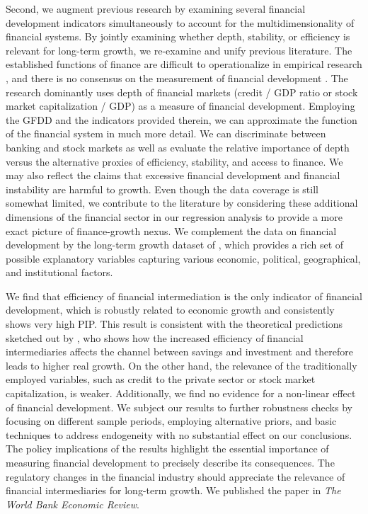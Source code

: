 \begin{refsection}
Second, we augment previous research by examining several financial development indicators simultaneously to account for the multidimensionality of financial systems. By jointly examining whether depth, stability, or efficiency is relevant for long-term growth, we re-examine and unify previous literature. The established functions of finance are difficult to operationalize in empirical research \parencite{Valickovaetal2014}, and there is no consensus on the measurement of financial development \parencite{KingLevine1993a}. The research dominantly uses depth of financial markets (credit / GDP ratio or stock market capitalization / GDP) as a measure of financial development. Employing the \ac{GFDD} and the indicators provided therein, we can approximate the function of the financial system in much more detail. We can discriminate between banking and stock markets as well as evaluate the relative importance of depth versus the alternative proxies of efficiency, stability, and access to finance. We may also reflect the claims that excessive financial development and financial instability are harmful to growth. Even though the data coverage is still somewhat limited, we contribute to the literature by considering these additional dimensions of the financial sector in our regression analysis to provide a more exact picture of finance-growth nexus. We complement the data on financial development by the long-term growth dataset of \textcite{Fernandezetal2001}, which provides a rich set of possible explanatory variables capturing various economic, political, geographical, and institutional factors.

We find that efficiency of financial intermediation is the only indicator of financial development, which is robustly related to economic growth and consistently shows very high \ac{PIP}. This result is consistent with the theoretical predictions sketched out by \textcite{Pagano1993}, who shows how the increased efficiency of financial intermediaries affects the channel between savings and investment and therefore leads to higher real growth. On the other hand, the relevance of the traditionally employed variables, such as credit to the private sector or stock market capitalization, is weaker. Additionally, we find no evidence for a non-linear effect of financial development. We subject our results to further robustness checks by focusing on different sample periods, employing alternative priors, and basic techniques to address endogeneity with no substantial effect on our conclusions. The policy implications of the results highlight the essential importance of measuring financial development to precisely describe its consequences. The regulatory changes in the financial industry should appreciate the relevance of financial intermediaries for long-term growth. We published the paper in \emph{The World Bank Economic Review}.


\end{refsection}
